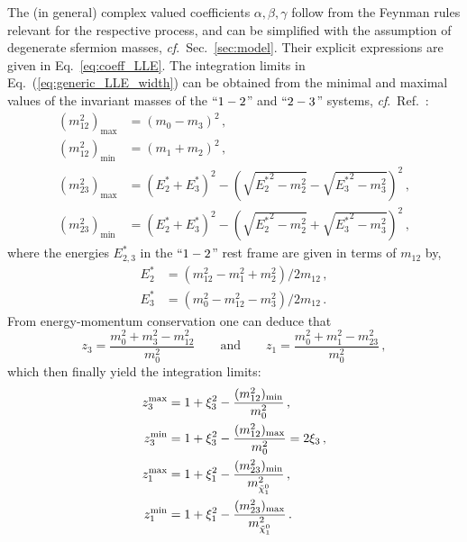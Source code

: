The (in general) complex valued coefficients $\alpha, \beta, \gamma$ follow from the Feynman rules relevant for the respective process, and can be simplified with the assumption of degenerate sfermion masses, \textit{cf}.~Sec.~\ref{sec:model}.
Their explicit expressions are given in Eq.~\eqref{eq:coeff_LLE}.
The integration limits in Eq.~(\ref{eq:generic_LLE_width}) can be obtained from the minimal and maximal values of the invariant masses of the $``1-2$'' and $``2-3$'' systems, \textit{cf}.~Ref.~\cite{ParticleDataGroup:2022pth}:
\begin{align}
    (m_{12}^2)_\text{max} &= (m_0-m_{3})^2\, , \label{eq:inv_masses1}\\
    (m_{12}^2)_\text{min} &= (m_1+m_{2})^2 \, , \\
    (m_{23}^2)_\text{max} &= (E_{2}^*+E_{3}^*)^2 - \left(\sqrt{{E_{2}^*}^2-m_{2}^2}-\sqrt{{E_{3}^*}^2-m_{3}^2}\right)^2 \, ,\\
    (m_{23}^2)_\text{min} &= (E_{2}^*+E_{3}^*)^2 - \left(\sqrt{{E_{2}^*}^2-m_{2}^2}+\sqrt{{E_{3}^*}^2-m_{3}^2}\right)^2 \, ,
\end{align}
where the energies $E_{2,3}^*$ in the $``1-2$'' rest frame are given in terms of $m_{12}$ by,
\begin{align}
    E_{2}^* &= (m_{12}^2-m_1^2+m_{2}^2)/2m_{12} \, ,\\
    E_{3}^* &= (m_0^2 - m_{12}^2-m_{3}^2)/2m_{12} \label{eq:E_star_minus}\, .
\end{align}
From energy-momentum conservation one can deduce that
\begin{equation}
    z_{3} = \frac{m_0^2+m_{3}^2 - m_{12}^2}{m_0^2} \qquad \text{and} \qquad z_{1} = \frac{m_0^2 +m_1^2 - m_{23}^2}{m_0^2}\, ,
\end{equation}
which then finally yield the integration limits:
\begin{align}
    z_{3}^\text{max} &= 1 + \xi_{3}^2 - \frac{(m_{12}^2)_\text{min}}{m_0^2} \, ,\\
    z_{3}^\text{min} &= 1 + \xi_{3}^2 - \frac{(m_{12}^2)_\text{max}}{m_0^2} = 2\xi_{3} \, ,\\
    z_1^\text{max} &= 1 + \xi_{1}^2 - \frac{(m_{23}^2)_\text{min}}{m_{\tilde\chi_1^0}^2} \, ,\\
    z_1^\text{min} &= 1 + \xi_{1}^2 - \frac{(m_{23}^2)_\text{max}}{m_{\tilde\chi_1^0}^2}\, .
\end{align}